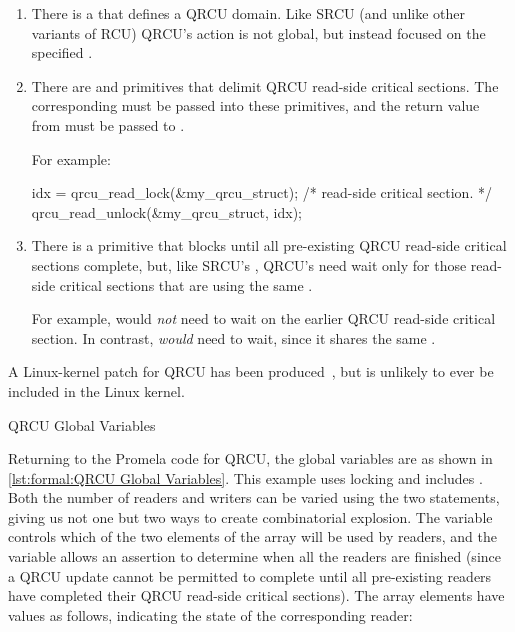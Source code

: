 \begin{enumerate}
\item	There is a  that defines a QRCU domain.
	Like SRCU (and unlike other variants of RCU) QRCU's action
	is not global, but instead focused on the specified
	.
\item	There are  and 
	primitives that delimit QRCU read-side critical sections.
	The corresponding  must be passed into
	these primitives, and the return value from 
	must be passed to .

	For example:

\begin{VerbatimU}
idx = qrcu_read_lock(&my_qrcu_struct);
/* read-side critical section. */
qrcu_read_unlock(&my_qrcu_struct, idx);
\end{VerbatimU}

\item	There is a  primitive that blocks until
	all pre-existing QRCU read-side critical sections complete,
	but, like SRCU's , QRCU's
	 need wait only for those read-side
	critical sections that are using the same .

	For example, 
	would \emph{not} need to wait on the earlier QRCU read-side
	critical section.
	In contrast, 
	\emph{would} need to wait, since it shares the same
	.
\end{enumerate}

A Linux-kernel patch for QRCU has been
produced~\cite{PaulMcKenney2007QRCUpatch},
but is unlikely to ever be included in the Linux kernel.

\begin{listing}

\caption{QRCU Global Variables}
\label{lst:formal:QRCU Global Variables}
\end{listing}

Returning to the Promela code for QRCU, the global variables are as shown in
\cref{lst:formal:QRCU Global Variables}.
This example uses locking and includes .
Both the number of readers and writers can be varied using the
two  statements, giving us not one but two ways to create
combinatorial explosion.
The  variable controls which of the two elements of the 
array will be used by readers, and the  variable
allows an assertion to determine when all the readers are finished
(since a QRCU update cannot be permitted to complete until all
pre-existing readers have completed their QRCU read-side critical
sections).
The  array elements have values as follows,
indicating the state of the corresponding reader:

